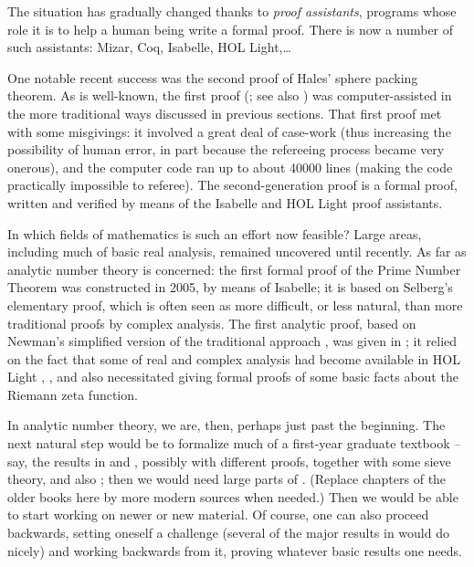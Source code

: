 The situation has
gradually changed thanks to {\em proof assistants}, programs whose role it is
to help a human being write a formal proof. There is now a number of such
assistants: Mizar, Coq, Isabelle, HOL Light,\dots

One notable recent success was the second proof of Hales'
sphere packing theorem. As is well-known, the first proof
(\cite{Hales2005}; see also \cite{lagarias2011kepler}) 
was computer-assisted in the more traditional ways discussed in previous
sections. That first proof
met with some misgivings: it involved a great deal of case-work
(thus increasing the possibility of human error, in part because
the
refereeing process became very onerous), and the computer code 
ran up to about 40000 lines (making the code practically impossible to referee).
The second-generation proof \cite{Halesetal2017a} is a formal proof,
written and verified by means of the Isabelle and HOL Light proof assistants.

In which fields of mathematics is such an effort now feasible?
Large areas, including much of basic real analysis, remained uncovered until
recently. As far as analytic number theory is concerned: the first formal
proof of the Prime Number Theorem \cite{avigad2007formally} was constructed
in 2005, by means of Isabelle; it is based on Selberg's elementary proof,
which is
often seen as more difficult, or less natural, than more traditional proofs
by complex analysis. The first analytic proof, based on Newman's simplified
version of the traditional approach \cite{newman1980simple}, was given in
\cite{harrison-pnt}; it relied on the fact that some of real and complex analysis had become available in HOL Light \cite{harrison2005hol}, \cite{harrison2007formalizing}, and also necessitated giving
formal proofs of some basic facts about the Riemann zeta function. 

In analytic number theory, we are, then, perhaps just past the beginning.
The next natural step would be to formalize much of a first-year graduate
textbook -- say, the results in \cite{MR0217022} and \cite{MR2378655},
possibly with different
proofs, together with some sieve theory, and also \cite{zbMATH03968684};
then we would need large parts of \cite{MR2061214}.
(Replace chapters of the older books here by more modern sources when needed.) Then we would be able to
start working on newer or new material. Of course, one can also proceed
backwards, setting oneself a challenge (several of the major results in
\cite{MR2061214} would do nicely) and working backwards from it,
proving whatever basic results one needs.

